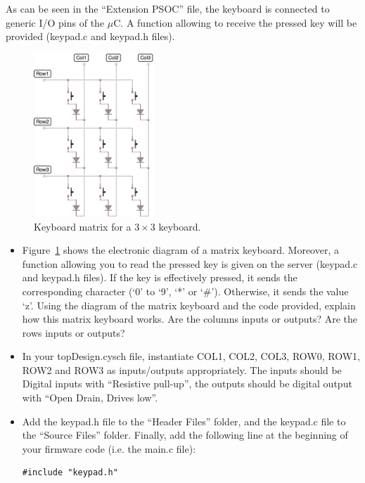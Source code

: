 \documentclass[11pt,a4paper]{article}
\theoremstyle{definition}%
\begin{document}
As can be seen in the ``Extension PSOC'' file, the keyboard is connected to generic I/O pins of the $\mu$C.
A function allowing to receive the pressed key will be provided (keypad.c and keypad.h files).

\begin{figure}[H]
\center
\includegraphics[width=0.4\textwidth]{keyboard_matrix}
\caption{Keyboard matrix for a $3\times 3$ keyboard.}
\label{fig:keyboard_matrix}
\end{figure}

\begin{itemize}
	\item Figure~\ref{fig:keyboard_matrix} shows the electronic diagram of a matrix keyboard. Moreover, a function allowing you to read the pressed key is given on the server (keypad.c and keypad.h files). If the key is effectively pressed, it sends the corresponding character (‘0’ to ‘9’, ‘*’ or ‘\#’).	Otherwise, it sends the value ‘z’. Using the diagram of the matrix keyboard and the code provided, explain how this matrix keyboard works. Are the columns inputs or outputs? Are the rows inputs or outputs? 
	\item In your topDesign.cysch file, instantiate COL1, COL2, COL3, ROW0, ROW1, ROW2 and ROW3 as inputs/outputs appropriately. The inputs should be Digital inputs with ``Resistive pull-up'', the outputs should be digital output with ``Open Drain, Drives low''. 
	\item Add the keypad.h file to the ``Header Files'' folder, and the keypad.c file to the ``Source Files'' folder. Finally, add the following line at the beginning of your firmware code (i.e. the main.c file): 
\begin{lstlisting}[style=CStyle]
#include "keypad.h"	
\end{lstlisting}
\end{itemize}
\end{document}
